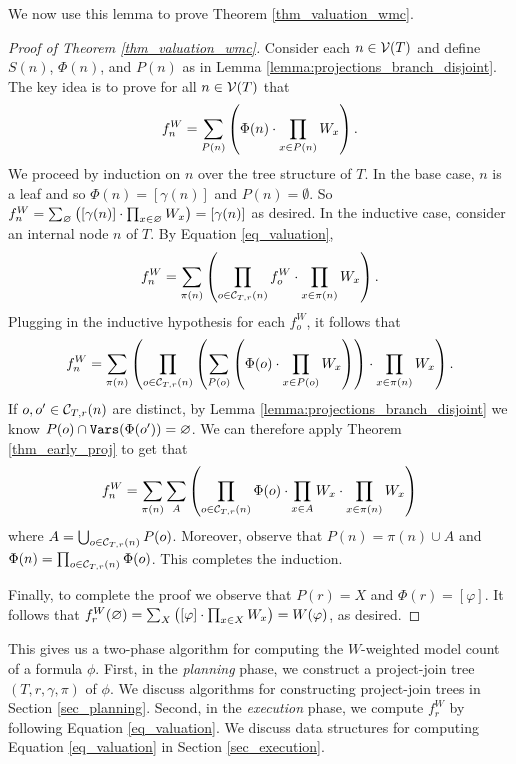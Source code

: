 We now use this lemma to prove Theorem \ref{thm_valuation_wmc}.
\begin{proof}[Proof of Theorem \ref{thm_valuation_wmc}]
Consider each $n \in \mathcal{V}(T)$ and define $S(n)$, $\Phi(n)$, and $P(n)$ as in Lemma \ref{lemma:projections_branch_disjoint}. The key idea is to prove for all $n \in \mathcal{V}(T)$ that 
$$f^W_n = \sum_{P(n)} \left(  \Phi(n) \cdot \prod_{x \in P(n)} W_x  \right) \label{eqn:valuation:correctness}.$$
We proceed by induction on $n$ over the tree structure of $T$. In the base case, $n$ is a leaf and so $\Phi(n) = [\gamma(n)]$ and $P(n) = \emptyset$. So $f^W_n = \sum_{\varnothing} \left(  [\gamma(n)] \cdot \prod_{x \in \varnothing} W_x  \right) = [\gamma(n)]$ as desired. In the inductive case, consider an internal node $n$ of $T$. By Equation \ref{eq_valuation}, $$f^W_n = \sum_{\pi(n)} \left( \prod_{o \in \mathcal{C}_{T,r}(n)} f^W_o \cdot \prod_{x \in \pi(n)} W_x \right).$$
Plugging in the inductive hypothesis for each $f^W_o$, it follows that
$$f^W_n = \sum_{\pi(n)} \left( \prod_{o \in \mathcal{C}_{T,r}(n)} \left( \sum_{P(o)} \left(  \Phi(o) \cdot \prod_{x \in P(o)} W_{x}  \right)  \right) \cdot \prod_{x \in \pi(n)} W_{x} \right).$$
If $o, o' \in \mathcal{C}_{T,r}(n)$ are distinct, by Lemma \ref{lemma:projections_branch_disjoint} we know $P(o) \cap \texttt{\upshape Vars}(\Phi(o')) = \varnothing$. We can therefore apply Theorem \ref{thm_early_proj} to get that
$$f^W_n = \sum_{\pi(n)} \sum_{A} \left(  \prod_{o \in \mathcal{C}_{T,r}(n)} \Phi(o) \cdot \prod_{x \in A} W_{x} \cdot \prod_{x \in \pi(n)} W_{x}  \right)$$
where $A = \bigcup_{o \in \mathcal{C}_{T,r}(n)} P(o)$. Moreover, observe that $P(n) = \pi(n) \cup A$ and $\Phi(n) = \prod_{o \in \mathcal{C}_{T,r}(n)} \Phi(o)$. This completes the induction.

Finally, to complete the proof we observe that $P(r) = X$ and $\Phi(r) = [\varphi]$. It follows that $f^W_r(\varnothing) = \sum_X \left(  [\varphi] \cdot \prod_{x \in X} W_x  \right) = W(\varphi)$, as desired.
\end{proof}

This gives us a two-phase algorithm for computing the $W$-weighted model count of a formula $\phi$.
First, in the \emph{planning} phase, we construct a project-join tree $(T, r, \gamma, \pi)$ of $\phi$.
We discuss algorithms for constructing project-join trees in Section \ref{sec_planning}.
Second, in the \emph{execution} phase, we compute $f^W_r$ by following Equation \eqref{eq_valuation}.
We discuss data structures for computing Equation \eqref{eq_valuation} in Section \ref{sec_execution}.

